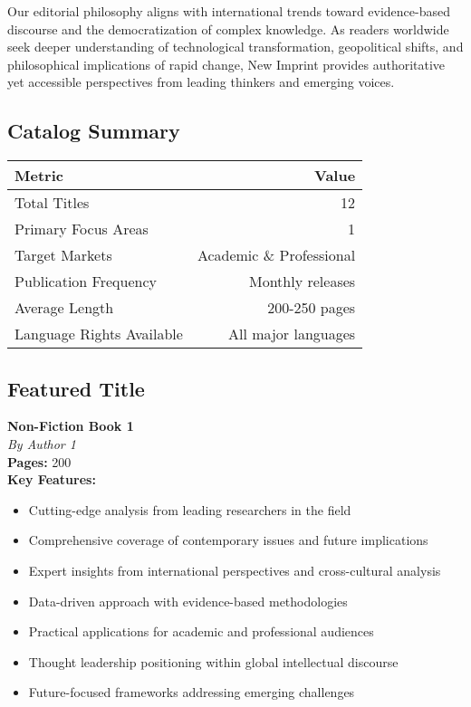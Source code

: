 \documentclass[11pt]{article}
\begin{document}
Our editorial philosophy aligns with international trends toward evidence-based discourse and the democratization of complex knowledge. As readers worldwide seek deeper understanding of technological transformation, geopolitical shifts, and philosophical implications of rapid change, New Imprint provides authoritative yet accessible perspectives from leading thinkers and emerging voices.

\subsection{Catalog Summary}

\begin{center}
\begin{tabular}{|l|r|}
\hline
\textbf{Metric} & \textbf{Value} \\
\hline
Total Titles & 12 \\
Primary Focus Areas & 1 \\
Target Markets & Academic \& Professional \\
Publication Frequency & Monthly releases \\
Average Length & 200-250 pages \\
Language Rights Available & All major languages \\
\hline
\end{tabular}
\end{center}

\subsection{Featured Title}

\textbf{Non-Fiction Book 1}\\
\textit{By Author 1} \\[0.4cm]

\textbf{Pages:} 200\\[0.3cm]

\textbf{Key Features:}
\begin{itemize}
\item Cutting-edge analysis from leading researchers in the field
\item Comprehensive coverage of contemporary issues and future implications
\item Expert insights from international perspectives and cross-cultural analysis
\item Data-driven approach with evidence-based methodologies
\item Practical applications for academic and professional audiences
\item Thought leadership positioning within global intellectual discourse
\item Future-focused frameworks addressing emerging challenges
\end{itemize}
\end{document}
